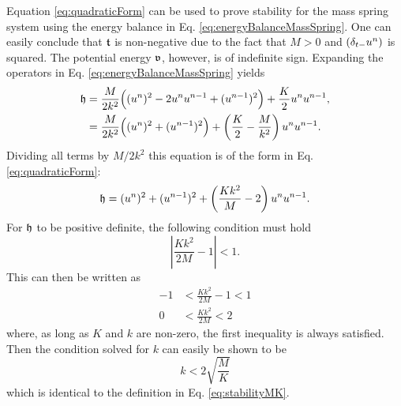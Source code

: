 {{{{Equation \eqref{eq:quadraticForm} can be used to prove stability for the mass spring system using the energy balance in Eq. \eqref{eq:energyBalanceMassSpring}. One can easily conclude that $\mathfrak{t}$ is non-negative due to the fact that  $M > 0$ and $(\delta_{t-} u^n)$ is squared. The potential energy $\mathfrak{v}$, however, is of indefinite sign. Expanding the operators in Eq. \eqref{eq:energyBalanceMassSpring} yields
\begin{align*}
    \mathfrak{h} &= \frac{M}{2k^2}\Big((u^n)^2 - 2u^n u^{n-1} + (u^{n-1})^2\Big)+ \frac{K}{2}u^n u^{n-1},\\
    &= \frac{M}{2k^2}\Big((u^n)^2+ (u^{n-1})^2\Big)+ \left(\frac{K}{2}-\frac{M}{k^2}\right)u^n u^{n-1}.
\end{align*}
Dividing all terms by $M/2k^2$ this equation is of the form in Eq. \eqref{eq:quadraticForm}:
\begin{equation*}
    \mathfrak{h} = (u^n)^2+ (u^{n-1})^2+ \left(\frac{Kk^2}{M} - 2\right)u^n u^{n-1}.
\end{equation*}
For $\mathfrak{h}$ to be positive definite, the following condition must hold
\begin{equation*}
    \left|\frac{Kk^2}{2M} - 1\right| < 1.
\end{equation*}
This can then be written as
\begin{align*}
    -1&<\frac{Kk^2}{2M} - 1<1\\
    0 &< \frac{Kk^2}{2M} < 2
\end{align*}
where, as long as $K$ and $k$ are non-zero, the first inequality is always satisfied. Then the condition solved for $k$ can easily be shown to be
\begin{equation}
    k < 2\sqrt{\frac{M}{K}}
\end{equation}
which is identical to the definition in Eq. \eqref{eq:stabilityMK}.

}}}}
